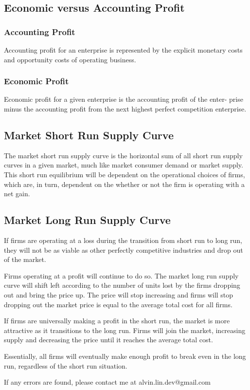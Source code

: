 \documentclass[letterpaper, 12pt]{article}
\begin{document}
\subsection{Economic versus Accounting Profit}

\subsubsection{Accounting Profit}
Accounting profit for an enterprise is represented by the explicit monetary
costs and opportunity costs of operating business.

\subsubsection{Economic Profit}
Economic profit for a given enterprise is the accounting profit of the enter-
prise minus the accounting profit from the next highest perfect competition
enterprise.

\subsection{Market Short Run Supply Curve}
The market short run supply curve is the horizontal sum of all short
run supply curves in a given market, much like market consumer demand
or market supply. This short run equilibrium will be dependent on the
operational choices of firms, which are, in turn, dependent on the whether or
not the firm is operating with a net gain.

\subsection{Market Long Run Supply Curve}
If firms are operating at a loss during the transition from short run to long
run, they will not be as viable as other perfectly competitive industries and
drop out of the market. \par
Firms operating at a profit will continue to do so.
The market long run supply curve will shift left according to the number of
units lost by the firms dropping out and bring the price up. The price will
stop increasing and firms will stop dropping out the market price is equal to
the average total cost for all firms. \par
If firms are universally making a profit in the short run, the market is more
attractive as it transitions to the long run. Firms will join the market,
increasing supply and decreasing the price until it reaches the average total
cost. \par
Essentially, all firms will eventually make enough profit to break even in the
long run, regardless of the short run situation.

\begin{center}
  If any errors are found, please contact me at alvin.lin.dev@gmail.com
\end{center}
\end{document}

